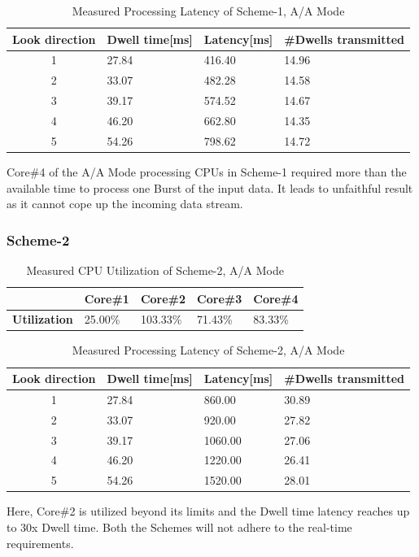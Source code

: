 \begin{table}[h!]
	\centering
	\begin{tabular}{|c|l|l|l|} 
	 \hline
	 \textbf{Look direction} & \textbf{Dwell time[ms]} & \textbf{Latency[ms]} & \textbf{\#Dwells transmitted} \\
	 \hline
	 1 & 27.84 & 416.40 & 14.96 \\ \hline
	 2 & 33.07 & 482.28 & 14.58 \\ \hline
	 3 & 39.17 & 574.52 & 14.67 \\ \hline
	 4 & 46.20 & 662.80 & 14.35 \\ \hline
	 5 & 54.26 & 798.62 & 14.72 \\ \hline
	\end{tabular}
	\caption{Measured Processing Latency of Scheme-1, A/A Mode}
	\label{tbl:mm:scheme1_true_latency}
\end{table}
Core\#4 of the A/A Mode processing CPUs in Scheme-1 required more than the available time to process one Burst of the input data. It leads to unfaithful result as it cannot cope up the incoming data stream.
\FloatBarrier

\subsubsection{Scheme-2}
\begin{table}[h!]
	\centering
	\begin{tabular}{|l|l|l|l|l|} 
	 \hline
	& \textbf{Core\#1} & \textbf{Core\#2} & \textbf{Core\#3} & \textbf{Core\#4} \\ \hline
	\textbf{Utilization} & 25.00\% & {\color{red} 103.33\%} & 71.43\% & 83.33\% \\ \hline
	\end{tabular}
	\caption{Measured CPU Utilization of Scheme-2, A/A Mode}
	\label{tbl:mm:scheme2_true_util}
\end{table}

\begin{table}[h!]
	\centering
	\begin{tabular}{|c|l|l|l|} 
	 \hline
	 \textbf{Look direction} & \textbf{Dwell time[ms]} & \textbf{Latency[ms]} & \textbf{\#Dwells transmitted} \\
	 \hline
	 1 & 27.84 & 860.00 & 30.89 \\ \hline
	 2 & 33.07 & 920.00 & 27.82 \\ \hline
	 3 & 39.17 & 1060.00 & 27.06 \\ \hline
	 4 & 46.20 & 1220.00 & 26.41 \\ \hline
	 5 & 54.26 & 1520.00 & 28.01 \\ \hline
	\end{tabular}
	\caption{Measured Processing Latency of Scheme-2, A/A Mode}
	\label{tbl:mm:scheme2_true_latency}
\end{table}
\FloatBarrier
Here, Core\#2 is utilized beyond its limits and the Dwell time latency reaches up to 30x Dwell time. Both the Schemes will not adhere to the real-time requirements.

